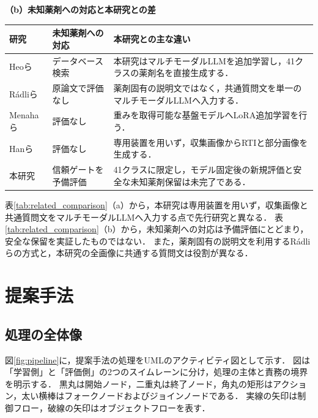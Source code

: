 \documentclass[uplatex,dvipdfmx]{jsarticle}
\begin{document}
\begin{table}[H]
  \vspace{3mm}
  \textbf{（b）未知薬剤への対応と本研究との差}\\[1mm]
  \begin{tabularx}{\textwidth}{|>{\raggedright\arraybackslash}p{1.55cm}|>{\raggedright\arraybackslash}p{3.2cm}|>{\raggedright\arraybackslash}X|}
    \hline
    研究 & 未知薬剤への対応 & 本研究との主な違い \\ \hline
    Heoら\cite{heo2023pill} & データベース検索 & 本研究はマルチモーダルLLMを追加学習し，41クラスの薬剤名を直接生成する． \\ \hline
    Rádliら\cite{radli2024word,radli2024metric} & 原論文で評価なし & 薬剤固有の説明文ではなく，共通質問文を単一のマルチモーダルLLMへ入力する． \\ \hline
    Menahaら\cite{menaha2024gemini} & 評価なし & 重みを取得可能な基盤モデルへLoRA追加学習を行う． \\ \hline
    Hanら\cite{han2021blister} & 評価なし & 専用装置を用いず，収集画像からRTIと部分画像を生成する． \\ \hline
    本研究 & 信頼ゲートを予備評価 & 41クラスに限定し，モデル固定後の新規評価と安全な未知薬剤保留は未完了である． \\ \hline
  \end{tabularx}
\end{table}

表\ref{tab:related_comparison}（a）から，本研究は専用装置を用いず，収集画像と共通質問文をマルチモーダルLLMへ入力する点で先行研究と異なる．
表\ref{tab:related_comparison}（b）から，未知薬剤への対応は予備評価にとどまり，安全な保留を実証したものではない．
また，薬剤固有の説明文を利用するRádliらの方式と，本研究の全画像に共通する質問文は役割が異なる．

\clearpage

\section{提案手法}\label{sec:method}

\subsection{処理の全体像}

図\ref{fig:pipeline}に，提案手法の処理をUMLのアクティビティ図として示す．
図は「学習側」と「評価側」の2つのスイムレーンに分け，処理の主体と責務の境界を明示する．
黒丸は開始ノード，二重丸は終了ノード，角丸の矩形はアクション，太い横棒はフォークノードおよびジョインノードである．
実線の矢印は制御フロー，破線の矢印はオブジェクトフローを表す．
\end{document}

